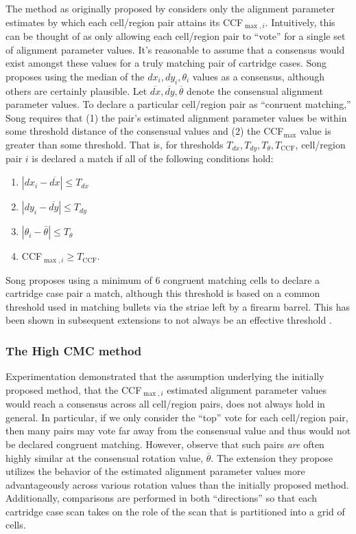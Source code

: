 The method as originally proposed by \citet{song_proposed_2013}
considers only the alignment parameter estimates by which each
cell/region pair attains its CCF\(_{\max,i}\). Intuitively, this can be
thought of as only allowing each cell/region pair to ``vote'' for a
single set of alignment parameter values. It's reasonable to assume that
a consensus would exist amongst these values for a truly matching pair
of cartridge cases. Song proposes using the median of the
\(dx_i, dy_i, \theta_i\) values as a consensus, although others are
certainly plausible. Let
\(\overline{dx}, \overline{dy}, \overline{\theta}\) denote the
consensual alignment parameter values. To declare a particular
cell/region pair as ``conruent matching,'' Song requires that (1) the
pair's estimated alignment parameter values be within some threshold
distance of the consensual values and (2) the CCF\(_{\max}\) value is
greater than some threshold. That is, for thresholds
\(T_{dx}, T_{dy}, T_{\theta},T_{\text{CCF}}\), cell/region pair \(i\) is
declared a match if all of the following conditions hold:

\begin{enumerate}
\item $|dx_i - \overline{dx}| \leq T_{dx}$ \\
\item $|dy_i - \overline{dy}| \leq T_{dy}$ \\
\item $|\theta_i - \bar{\theta}| \leq T_{\theta}$ \\
\item CCF$_{\max,i} \geq T_{\text{CCF}}$.
\end{enumerate}

Song proposes using a minimum of 6 congruent matching cells to declare a
cartridge case pair a match, although this threshold is based on a
common threshold used in matching bullets via the striae left by a
firearm barrel. This has been shown in subsequent extensions to not
always be an effective threshold \citep{chen_convergence_2017}.

\hypertarget{highCMCMethod}{%
\subsubsection{The High CMC method}\label{highCMCMethod}}

Experimentation demonstrated that the assumption underlying the
initially proposed method, that the CCF\(_{\max,i}\) estimated alignment
parameter values would reach a consensus across all cell/region pairs,
does not always hold in general. In particular, if we only consider the
``top'' vote for each cell/region pair, then many pairs may vote far
away from the consensual value and thus would not be declared congruent
matching. However, \citet{tong_improved_2015} observe that such pairs
\emph{are} often highly similar at the consensual rotation value,
\(\overline{\theta}\). The extension they propose utilizes the behavior
of the estimated alignment parameter values more advantageously across
various rotation values than the initially proposed method.
Additionally, comparisons are performed in both ``directions'' so that
each cartridge case scan takes on the role of the scan that is
partitioned into a grid of cells.

